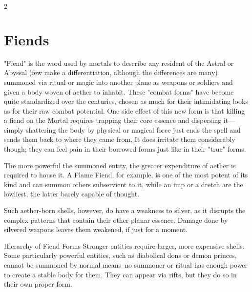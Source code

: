 \clearpage
\begin{multicols}{2}
\section{Fiends}
	\raggedcolumns
"Fiend" is the word used by mortals to describe any resident of the Astral or Abyssal (few make a differentiation, although the differences are many) summoned via ritual or magic into another plane as weapons or soldiers and given a body woven of aether to inhabit. These "combat forms" have become quite standardized over the centuries, chosen as much for their intimidating looks as for their raw combat potential. One side effect of this new form is that killing a fiend on the Mortal requires trapping their core essence and dispersing it---simply shattering the body by physical or magical force just ends the spell and sends them back to where they came from. It does irritate them considerably though; they can feel pain in their borrowed forms just like in their "true" forms.

The more powerful the summoned entity, the greater expenditure of aether is required to house it. A Flame Fiend, for example, is one of the most potent of its kind and can summon others subservient to it, while an imp or a dretch are the lowliest, the latter barely capable of thought.

Such aether-born shells, however, do have a weakness to silver, as it disrupts the complex patterns that contain their other-planar essence. Damage done by silvered weapons leaves them weakened, if just for a moment.

\begin{DndComment}{Hierarchy of Fiend Forms}
	Stronger entities require larger, more expensive shells. Some particularly powerful entities, such as diabolical dons or demon princes, cannot be summoned by normal means--no summoner or ritual has enough power to create a stable body for them. They can appear via rifts, but they do so in their own proper form.


\end{DndComment}
\end{multicols}
